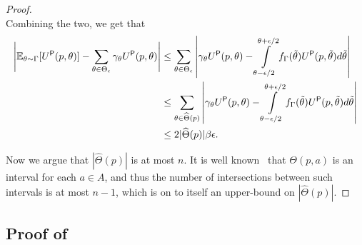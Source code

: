 \begin{proof}
\[    \]
    Combining the two, we get that
    \begin{align*}
        \left|\mathbb{E}_{\theta\sim\Gamma}[U^\textsf{P}(p,\theta)]-\sum_{\theta\in\Theta_\epsilon}\gamma_\theta U^\textsf{P}(p,\theta)\right|&\le \sum_{\theta\in\Theta_\epsilon}\left|\gamma_\theta U^\textsf{P}(p,\theta)-\int\limits_{\theta-\epsilon/2}^{\theta+\epsilon/2}f_\Gamma(\tilde\theta)U^\textsf{P}(p,\tilde\theta)d\tilde\theta\right|\\
        &\le \sum_{\theta\in\widehat\Theta(p)}\left|\gamma_\theta U^\textsf{P}(p,\theta)-\int\limits_{\theta-\epsilon/2}^{\theta+\epsilon/2}f_\Gamma(\tilde\theta)U^\textsf{P}(p,\tilde\theta)d\tilde\theta\right|\\
        &\le 2|\widehat\Theta(p)|\beta\epsilon.
    \end{align*}

    Now we argue that $|\widehat\Theta(p)|$ is at most $n$. It is well known~\citep{alon2021contracts} that $\Theta(p,a)$ is an interval for each $a \in A$, and thus the number of intersections between such intervals is at most $n-1$, which is on to itself an upper-bound on $|\widehat\Theta(p)|$.
\end{proof}

\subsection{Proof of }

\samplecomplexity*

